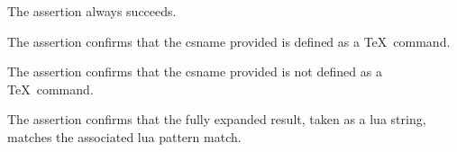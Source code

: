 The \type{\assertSucceed} assertion always succeeds.

\startMkIVCode
\def\assertSucceed#1{\assertionSucceeded{#1}}
\stopMkIVCode

\stopTestSuite

\startTestSuite[assertDefined]

The \type{\assertDefined} assertion confirms that the csname provided 
is defined as a \TeX\ command. 






\startMkIVCode
\def\assertDefined#1#2{%
  \expandafter\ifx\csname#1\endcsname\relax%
    \assertionFailed{#2}{Expected #1 to be defined}%
  \else%
    \assertionSucceeded{#2}{}%
  \fi
}
\stopMkIVCode

\stopTestSuite

\startTestSuite[assertNotDefined]

The \type{\assertNotDefined} assertion confirms that the csname provided 
is not defined as a \TeX\ command. 

\startMkIVCode
\def\assertNotDefined#1#2{%
  \expandafter\ifx\csname#1\endcsname\relax%
    \assertionSucceeded{#2}%
  \else%
    \assertionFailed{#2}{Expected #1 to not be defined}%
  \fi
}
\stopMkIVCode

\stopTestSuite

\startTestSuite[assertStringMatches]

The \type{\assertStringMatches} assertion confirms that the fully expanded 
result, taken as a lua string, matches the associated lua pattern match. 

\startMkIVCode
\def\assertStringMatches#1#2#3{%
  \directlua{
    thirddata.contests.reportMkIVAssertions(
      string.match('#1','#2'),
      '#3',
      'Expected [#1] to match [#2]'
    )
  }
}
\stopMkIVCode

\stopTestSuite

\startTestSuite[assertStringDoesNotMatch]

